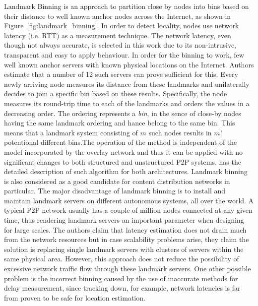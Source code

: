 Landmark Binning \cite{ratnasamy_binning_2002} is an approach to partition close
by nodes into bins based on their distance to well known anchor nodes across the
Internet, as shown in Figure~\ref{fig:landmark_binning}. In order to detect
locality, nodes use network latency (i.e. RTT) as a measurement technique. The
network latency, even though not always accurate, is selected in this work due
to its non-intrusive, transparent and easy to apply behaviour. In order for the
binning to work, few well known anchor servers with known physical locations on
the Internet. Authors estimate that a number of 12 such servers can prove
sufficient for this. Every newly arriving node measures its distance from these
landmarks and unilaterally decides to join a specific bin based on these
results. Specifically, the node measures its round-trip time to each of the
landmarks and orders the values in a decreasing order. The ordering represents
a \emph{bin}, in the sence of close-by nodes having the same landmark ordering
and hance belong to the same bin. This means that a landmark system consisting
of $m$ such nodes results in $m!$ potentional different bins.The operation of
the method is independent of the model incorporated by the overlay network and
thus it can be applied with no significant changes to both structured and
unstructured P2P systems. \cite{ratnasamy_binning_2002} has the detailed
description of such algorithm for both architectures. Landmark binning is also
considered as a good candidate for content distribution networks in particular.
The major disadvantage of landmark binning is to install and maintain landmark
servers on different autonomous systems, all over the world. A typical P2P
network usually has a couple of million nodes connected at any given time, thus
rendering landmark servers an important parameter when designing for large
scales.  The authors claim that latency estimation does not drain much from the
network resources but in case scalability problems arise, they claim the
solution is replacing single landmark servers with clusters of servers within
the same physical area. However, this approach does not reduce the possibility
of excessive network traffic flow through these landmark servers. One other
possible problem is the incorrect binning caused by the use of inaccurate
methods for delay measurement, since tracking down, for example, network
latencies is far from proven to be safe for location estimation.



